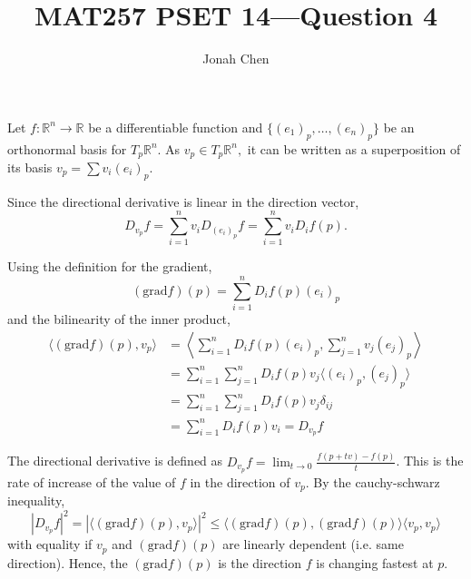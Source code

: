 \documentclass{exam}
\title{MAT257 PSET 14---Question 4}
\author{Jonah Chen}
\date{}
\numberwithin{equation}{section}
\newcommand{\R}{\mathbb{R}}
\begin{document}
    \sffamily
    \maketitle
    Let \(f:\R^n\to\R\) be a differentiable function and \(\{(e_1)_p,\dots,(e_n)_p\}\) be an orthonormal basis for \(T_p\R^n\). As \(v_p\in T_p\R^n,\) it can be written as a superposition of its basis \(v_p=\sum v_i(e_i)_p.\)

    Since the directional derivative is linear in the direction vector,
    \[D_{v_p}f=\sum_{i=1}^n v_iD_{(e_i)_p}f=\sum_{i=1}^nv_i D_if(p).\]

    Using the definition for the gradient,
    \[(\mathrm{grad} f)(p)=\sum_{i=1}^nD_if(p)(e_i)_p\]
    and the bilinearity of the inner product,
    \begin{align*}
        \langle(\mathrm{grad} f)(p),v_p\rangle&=\left\langle\sum_{i=1}^nD_if(p)(e_i)_p, \sum_{j=1}^nv_j(e_j)_p\right\rangle\\
        &=\sum_{i=1}^n\sum_{j=1}^nD_if(p)v_j\langle(e_i)_p,(e_j)_p\rangle\\
        &=\sum_{i=1}^n\sum_{j=1}^nD_if(p)v_j\delta_{ij}\\
        &=\sum_{i=1}^nD_if(p)v_i=D_{v_p}f
    \end{align*}

    The directional derivative is defined as \(D_{v_p}f=\lim_{t\to 0}\frac{f(p+tv)-f(p)}{t}\). This is the rate of increase of the value of \(f\) in the direction of \(v_p\). By the cauchy-schwarz inequality, \[|D_{v_p}f|^2=|\langle(\mathrm{grad} f)(p),v_p\rangle|^2\leq\langle(\mathrm{grad} f)(p),(\mathrm{grad} f)(p)\rangle\langle v_p,v_p\rangle\]
    with equality if \(v_p\) and \((\mathrm{grad} f)(p)\) are linearly dependent (i.e. same direction). Hence, the \((\mathrm{grad} f)(p)\) is the direction \(f\) is changing fastest at \(p\).
\end{document}
